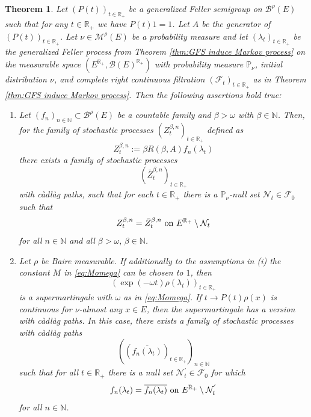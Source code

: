 \documentclass[a4paper,12pt]{article}
\newtheorem{theorem}{Theorem}[section]
\theoremstyle{definition}
\theoremstyle{remark}
\numberwithin{equation}{section}
\numberwithin{theorem}{section}
\begin{document}
\begin{theorem}
\label{thm:GFP have cadlag version}Let $\left(P(t)\right)_{t\in\mathbb{R}_{+}}$
be a generalized Feller semigroup on $\mathcal{\mathscr{B}}^{\rho}(E)$
such that for any $t\in\mathbb{R}_{+}$ we have $P(t)1=1$. 
Let $A$ be the generator
of $\left(P(t)\right)_{t\in\mathbb{R}_{+}}$. Let  $\nu\in\mathcal{M}^{\rho}(E)$ be a probability measure and
let $\left(\lambda_{t}\right)_{t\in\mathbb{R}_{+}}$ be the generalized
Feller process from Theorem \ref{thm:GFS induce Markov process} on
the measurable space
$
(E^{\mathbb{R}_{+}},\mathcal{B}(E)^{\mathbb{R}_{+}})
$
with probability measure $\mathbb{P}_{\nu}$, initial  distribution $\nu$, and complete right continuous
filtration $\left(\mathcal{F}_{t}\right)_{t\in\mathbb{R}_{+}}$ as
in Theorem \ref{thm:GFS induce Markov process}. Then the following assertions hold true:
\begin{enumerate}
\item[
(i)] Let $\left(f_{n}\right)_{n\in\mathbb{N}}\subset\mathcal{\mathscr{B}}^{\rho}(E)$ be a countable family 
and $\beta>\omega$ with $\beta\in\mathbb{N}$. Then, for the family of stochastic
processes $\left(Z_{t}^{\beta,n}\right)_{t\in\mathbb{R}_{+}}$ defined
as
\[
Z_{t}^{\beta,n}:=\beta R(\beta,A)f_{n}(\lambda_{t})
\]
there exists a family of stochastic processes
\[
\left(\bar{Z}_{t}^{\beta,n}\right)_{t\in\mathbb{R}_{+}}
\]
with càdlàg paths, such that for each $t\in\mathbb{R}_{+}$
there is a $\mathbb{P}_{\nu}$-null set $\mathcal{N}_{t}\in\mathcal{F}_{0}$ 
such that 
\[
Z_{t}^{\beta,n}=\bar{Z}_{t}^{\beta,n}\text{ on \ensuremath{E^{\mathbb{R}_{+}}\setminus\mathcal{N}_{t}}}
\]
 for all $n\in\mathbb{N}$ and all $\beta>\omega,\,\beta\in\mathbb{N}$. 

\item[(ii)]
Let $\rho$ be Baire measurable. If additionally to the assumptions in
(i) the constant $M$ in \eqref{eq:Momega}
can be chosen to $1$, then
\[
\left(\exp\left(-\omega t\right)\rho(\lambda_{t})\right)_{t\in\mathbb{R}_{+}}
\]
is a supermartingale with $\omega$ as in \eqref{eq:Momega}. If $t\rightarrow P(t)\rho(x)$ is continuous
for $\nu$-almost any $x\in E$, then the supermartingale has a version
with càdlàg paths. In this case, there exists
a family of stochastic processes with càdlàg paths
\[
\left(\left(\overline{f_{n}(\lambda_{t})}\right)_{t\in\mathbb{R}_{+}}\right)_{n\in\mathbb{N}}
\]
 such that for all $t\in\mathbb{R}_{+}$ there is a null set $\mathcal{N}{}_{t}^{'}\in \mathcal{F}_0$
for which 
\[
f_{n}(\lambda_{t})=\overline{f_{n}(\lambda_{t})}\text{ on \ensuremath{E^{\mathbb{R}_{+}}\setminus\mathcal{N}_{t}^{'}}}
\]
 for all $n\in\mathbb{N}$. 


\end{enumerate}
\end{theorem}
\end{document}
